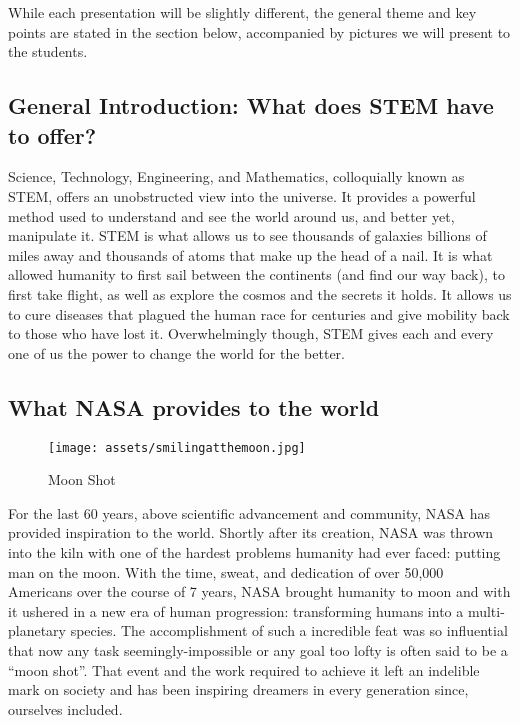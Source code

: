 \documentclass{article}
\let\Oldsubsection\subsection
\renewcommand{\subsection}{\FloatBarrier\Oldsubsection}
\begin{document}
While each presentation will be slightly different, the general theme and key points are stated in the section below, accompanied by pictures we will present to the students.

\subsection{General Introduction: What does STEM have to offer?}

Science, Technology, Engineering, and Mathematics, colloquially known as STEM, offers an unobstructed view into the universe. It provides a powerful method used to understand and see the world around us, and better yet, manipulate it. STEM is what allows us to see thousands of galaxies billions of miles away and thousands of atoms that make up the head of a nail. It is what allowed humanity to first sail between the continents (and find our way back), to first take flight, as well as explore the cosmos and the secrets it holds. It allows us to cure diseases that plagued the human race for centuries and give mobility back to those who have lost it. Overwhelmingly  though, STEM gives each and every one of us the power to change the world for the better.

\subsection{What NASA provides to the world}

\begin{figure}[!htb]
  \centering
  \texttt{[image: assets/smilingatthemoon.jpg]}
  \caption{Moon Shot}
  \label{fig:smilingatthemoon}
\end{figure}

For the last 60 years, above scientific advancement and community, NASA has provided inspiration to the world. Shortly after its creation, NASA was thrown into the kiln with one of the hardest problems humanity had ever faced: putting man on the moon. With the time, sweat, and dedication of over 50,000 Americans over the course of 7 years, NASA brought humanity to moon and with it ushered in a new era of human progression: transforming humans into a multi-planetary species. The accomplishment of such a incredible feat was so influential that now any task seemingly-impossible or any goal too lofty is often said to be a “moon shot”. That event and the work required to achieve it left an indelible mark on society and has been inspiring dreamers in every generation since, ourselves included.
\end{document}
